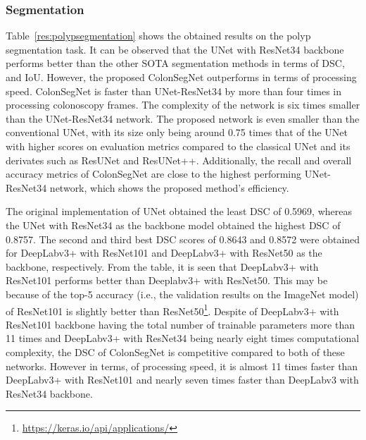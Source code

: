 \documentclass[journal]{IEEEtran}
\begin{document}
\subsubsection{Segmentation} 
Table~\ref{res:polypsegmentation} shows the obtained results on the polyp segmentation task. It can be observed that the UNet with ResNet34 backbone performs better than the other SOTA segmentation methods in terms of \ac{DSC}, and \ac{IoU}. However, the proposed ColonSegNet outperforms in terms of processing speed. ColonSegNet is faster than UNet-ResNet34 by more than four times in processing colonoscopy frames. The complexity of the network is six times smaller than the UNet-ResNet34 network. The proposed network is even smaller than the conventional UNet, with its size only being around 0.75 times that of the UNet with higher scores on evaluation metrics compared to the classical UNet and its derivates such as ResUNet and ResUNet++. Additionally, the recall and overall accuracy metrics of ColonSegNet are close to the highest performing UNet-ResNet34 network, which shows the proposed method's efficiency.


The original implementation of UNet obtained the least \ac{DSC} of 0.5969, whereas the UNet with ResNet34 as the backbone model obtained the highest \ac{DSC} of 0.8757. The second and third best \ac{DSC} scores of 0.8643 and 0.8572 were obtained for DeepLabv3+ with ResNet101 and DeepLabv3+ with ResNet50 as the backbone, respectively. From the table, it is seen that DeepLabv3+ with ResNet101 performs better than Deeplabv3+ with ResNet50. This may be because of the top-5 accuracy (i.e., the validation results on the ImageNet model) of ResNet101 is slightly better than ResNet50\footnote{\url{https://keras.io/api/applications/}}. Despite of DeepLabv3+ with ResNet101 backbone having the total number of trainable parameters more than 11 times and DeepLabv3+ with ResNet34 being nearly eight times computational complexity, the DSC of ColonSegNet is competitive compared to both of these networks. However in terms, of processing speed, it is almost 11 times faster than DeepLabv3+ with ResNet101 and nearly seven times faster than DeepLabv3 with ResNet34 backbone. 
\end{document}
